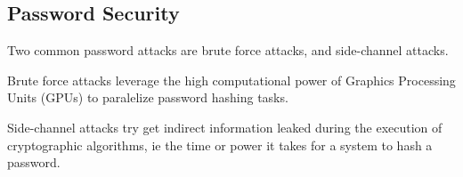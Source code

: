 %
%
%
%
%
%
%
%



\subsection{Password Security}\label{sec:security}

Two common password attacks are brute force attacks, and side-channel attacks.

Brute force attacks leverage the high computational power of Graphics Processing Units (GPUs) to paralelize password hashing tasks.

Side-channel attacks try get indirect information leaked during the execution of cryptographic algorithms, ie the time or power it takes for a system to hash a password.


